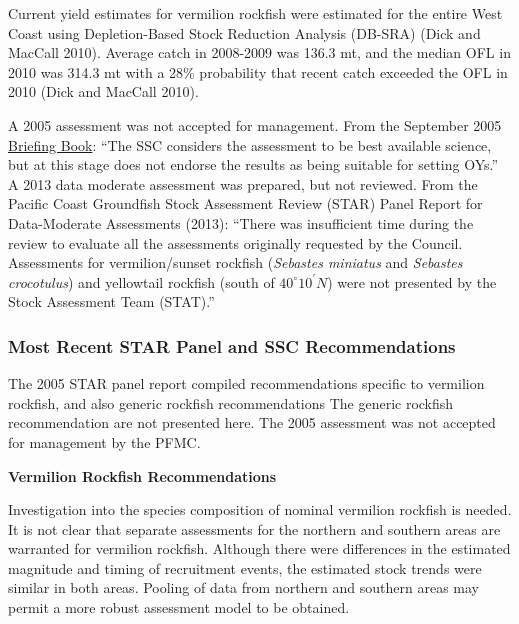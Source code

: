 \documentclass[11pt,
  english,
]{article}
\begin{document}
Current yield estimates for vermilion rockfish were estimated for the entire West Coast using Depletion-Based Stock Reduction Analysis (DB-SRA) {(Dick and MacCall 2010)\leavevmode\tagmcend\tagstructend}. Average catch in 2008-2009 was 136.3 mt, and the median OFL in 2010 was 314.3 mt with a 28\% probability that recent catch exceeded the OFL in 2010 {(Dick and MacCall 2010)\leavevmode\tagmcend\tagstructend}.

A 2005 assessment was not accepted for management. From the September 2005 {\href{https://www.pcouncil.org/documents/2005/09/f-groundfish-management-september-2005.pdf/}{Briefing Book}\leavevmode\tagmcend\tagstructend}: ``The SSC considers the assessment to be best available science, but at this stage does not endorse the results as being suitable for setting OYs.'' A 2013 data moderate assessment was prepared, but not reviewed. From the Pacific Coast Groundfish Stock Assessment Review (STAR) Panel Report for Data-Moderate Assessments (2013): ``There was insufficient time during the review to evaluate all the assessments originally requested by the Council. Assessments for vermilion/sunset rockfish (\emph{Sebastes miniatus} and \emph{Sebastes crocotulus}) and yellowtail rockfish (south of $40^\circ 10^\prime N$) were not presented by the Stock Assessment Team (STAT).''


\hypertarget{most-recent-star-panel-and-ssc-recommendations}{%
\subsubsection{Most Recent STAR Panel and SSC Recommendations}\label{most-recent-star-panel-and-ssc-recommendations}}

\leavevmode\tagmcend\tagstructend

The 2005 STAR panel report compiled recommendations specific to vermilion rockfish, and also generic rockfish recommendations The generic rockfish recommendation are not presented here. The 2005 assessment was not accepted for management by the PFMC.

\textbf{Vermilion Rockfish Recommendations}

Investigation into the species composition of nominal vermilion rockfish is needed. It is not clear that separate assessments for the northern and southern areas are warranted for vermilion rockfish. Although there were differences in the estimated magnitude and timing of recruitment events, the estimated stock trends were similar in both areas. Pooling of data from northern and southern areas may permit a more robust assessment model to be obtained.
\end{document}

